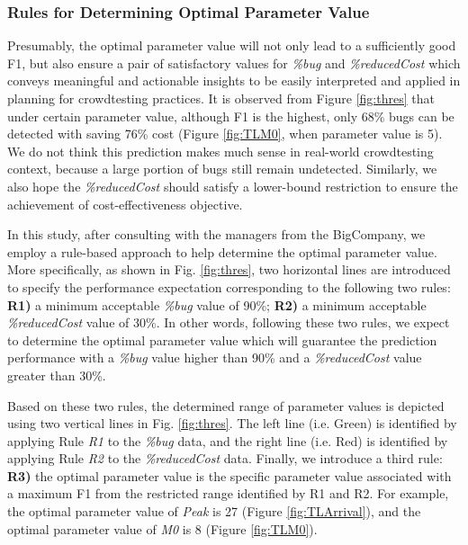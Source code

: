 \documentclass[sigconf,review, anonymous]{acmart}
\newcommand{\company}{BigCompany}
\begin{document}
\subsubsection{\textbf{Rules for Determining Optimal Parameter Value}}
\label{subsubsec:RQ1-2}

Presumably, the optimal parameter value will not only lead to a sufficiently good F1, but also ensure a pair of satisfactory values for \textit{\%bug} and  \textit{\%reducedCost} which conveys meaningful and actionable insights to be easily interpreted and applied in planning for crowdtesting practices.
It is observed from Figure \ref{fig:thres} that under certain parameter value, although F1 is the highest, only 68\% bugs can be detected with saving 76\% cost (Figure \ref{fig:TLM0}, when parameter value is 5).
We do not think this prediction makes much sense in real-world crowdtesting context, because a large portion of bugs still remain undetected.
Similarly, we also hope the  \textit{\%reducedCost} should satisfy a lower-bound restriction to ensure the achievement of cost-effectiveness objective.

In this study, after consulting with the managers from the {\company}, we employ a rule-based approach to help determine the optimal parameter value. 
More specifically, as shown in Fig. \ref{fig:thres}, two horizontal lines are introduced to specify the performance expectation corresponding to the following two rules: \textbf{R1)} a minimum acceptable \textit{\%bug} value of 90\%;  \textbf{R2)} a minimum acceptable \textit{\%reducedCost} value of 30\%.
In other words, following these two rules, we expect to determine the optimal parameter value which will guarantee the prediction performance with a \textit{\%bug} value higher than 90\% and a \textit{\%reducedCost} value greater than 30\%.


Based on these two rules, the determined range of parameter values is depicted using two vertical lines in Fig. \ref{fig:thres}.
The left line (i.e. Green) is identified by applying Rule \textit{R1} to the \textit{\%bug} data, and the right line (i.e. Red) is identified by applying Rule \textit{R2} to the \textit{\%reducedCost} data. 
Finally, we introduce a third rule: \textbf{R3)} the optimal parameter value is the specific parameter value associated with a maximum F1 from the restricted range identified by R1 and R2.
For example, the optimal parameter value of \textit{Peak} is 27 (Figure \ref{fig:TLArrival}), and the optimal parameter value of \textit{M0} is 8 (Figure \ref{fig:TLM0}).
\end{document}
